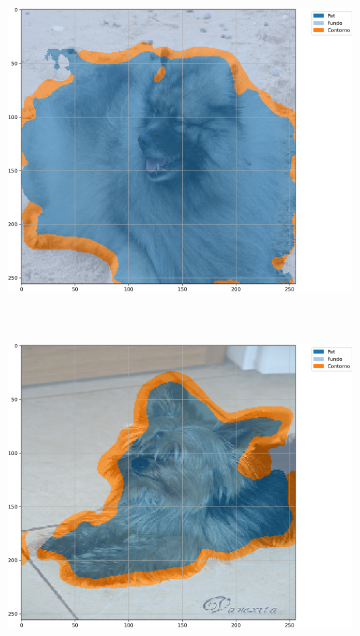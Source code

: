 \begin{figure}[H]
    \centering
    \caption{Exemplos segmentados a partir de U-Net com \textit{Max Pooling} e 500 épocas no conjunto de dados \textit{Oxford-IIIT Pets} baseada em mIoU.}
    \label{results:fig:semantic:2}
     \begin{subfigure}[t]{0.32\textwidth}
         \centering
         \includegraphics[width=1\linewidth]{recursos/imagens/results/max_miou_unet500_image_0_overlayed_segmentation.png}
         \label{results:fig:semantic:2.1}
     \end{subfigure}%
     ~ 
     \begin{subfigure}[t]{0.32\textwidth}
         \centering
         \includegraphics[width=1\linewidth]{recursos/imagens/results/max_miou_unet500_image_1_overlayed_segmentation.png}

\end{subfigure}
\end{figure}
